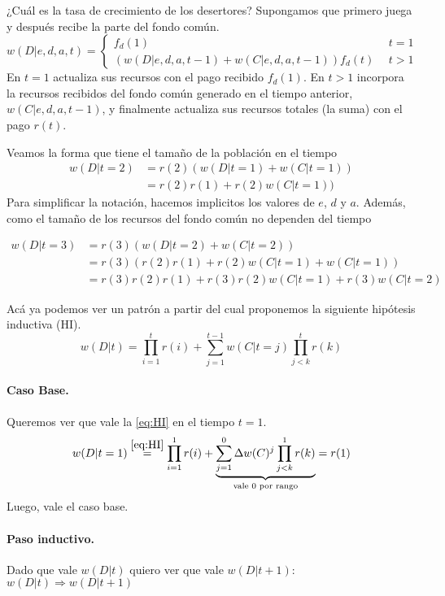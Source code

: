 \documentclass[a4paper,10pt]{article}
\begin{document}
¿Cuál es la tasa de crecimiento de los desertores?
Supongamos que primero juega y después recibe la parte del fondo común.
\begin{equation}
w(D|e,d,a,t) =
\begin{cases}
 f_d(1) & \ \  t=1 \\
 (w(D|e,d,a,t-1) + w(C|e,d,a,t-1)) f_d(t) & \ \  t>1
\end{cases}
\end{equation}
En $t=1$ actualiza sus recursos con el pago recibido $f_d(1)$.
En $t>1$ incorpora la recursos recibidos del fondo común generado en el tiempo anterior, $w(C|e,d,a,t-1)$, y finalmente actualiza sus recursos totales (la suma) con el pago $r(t)$.


Veamos la forma que tiene el tamaño de la población en el tiempo
\begin{align}
w(D|t=2) & = r(2) (w(D|t=1) + w(C|t=1)) \\
& = r(2)r(1) + r(2)w(C|t=1))
\end{align}
Para simplificar la notación, hacemos implicitos los valores de $e$, $d$ y $a$.
Además, como el tamaño de los recursos del fondo común no dependen del tiempo

\begin{align}
w(D|t=3) & = r(3) (w(D|t=2)+w(C|t=2)) \\
& = r(3) (r(2)r(1) + r(2)w(C|t=1) + w(C|t=1) ) \\
& = r(3)r(2)r(1) + r(3)r(2)w(C|t=1) + r(3)w(C|t=2) 
\end{align}

Acá ya podemos ver un patrón a partir del cual proponemos la siguiente hipótesis inductiva (HI).
\begin{equation} \label{eq:HI} \tag{HI} 
w(D|t) = \prod^t_{i=1} r(i) + \sum^{t-1}_{j=1} w(C|t=j)
\prod^t_{j<k} r(k)
\end{equation}

\paragraph{Caso Base.} Queremos ver que vale la \ref{eq:HI} en el tiempo $t=1$.
\begin{equation} 
w(D|t=1) \overset{\ref{eq:HI}}{=} \prod^1_{i=1} r(i) + \underbrace{\sum^{0}_{j=1} \Delta w(C)^j \prod^1_{j<k} r(k) }_{\text{vale $0$ por rango}} = r(1)
\end{equation}
Luego, vale el caso base.

\paragraph{Paso inductivo.} Dado que vale $w(D|t)$ quiero ver que vale $w(D|t+1)$: $w(D|t) \Rightarrow w(D|t+1)$
\end{document}
